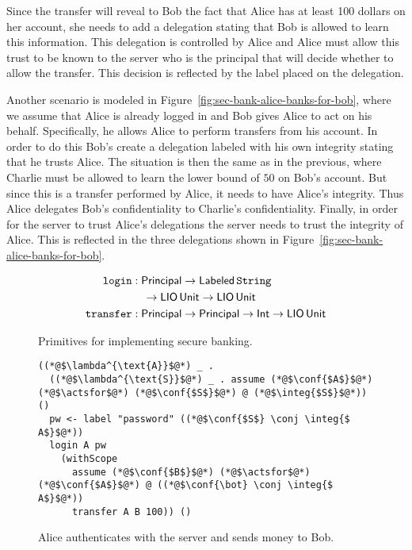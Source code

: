 Since the transfer will reveal to Bob the fact that Alice has at least 100 dollars on her account, she needs to add a delegation stating that Bob is allowed to learn this information. This delegation is controlled by Alice and Alice must allow this trust to be known to the server who is the principal that will decide whether to allow the transfer. This decision is reflected by the label placed on the delegation.

Another scenario is modeled in Figure~\ref{fig:sec-bank-alice-banks-for-bob}, where we assume that Alice is already logged in and Bob gives Alice to act on his behalf. Specifically, he allows Alice to perform transfers from his account. In order to do this Bob's create a delegation labeled with his own integrity stating that he trusts Alice. The situation is then the same as in the previous, where Charlie must be allowed to learn the lower bound of $50$ on Bob's account. But since this is a transfer performed by Alice, it needs to have Alice's integrity. Thus Alice delegates Bob's confidentiality to Charlie's confidentiality. Finally, in order for the server to trust Alice's delegations the server needs to trust the integrity of Alice. This is reflected in the three delegations shown in Figure~\ref{fig:sec-bank-alice-banks-for-bob}.

\begin{figure}
    \centering
    \begin{align*}
\mathtt{login}&: \mathsf{Principal} \to \mathsf{Labeled}\,\mathtt{String} \\ &\quad \to \mathsf{LIO}\,\mathsf{Unit} \to \mathsf{LIO}\,\mathsf{Unit}\\
\mathtt{transfer}&: \mathsf{Principal} \to \mathsf{Principal} \to \mathsf{Int} \to \mathsf{LIO}\,\mathsf{Unit}
\end{align*}
    \caption{Primitives for implementing secure banking.}
    \label{fig:sec-banking-sigs}
\end{figure}

\begin{figure}
\centering
\begin{lstlisting}
((*@$\lambda^{\text{A}}$@*) _ .
  ((*@$\lambda^{\text{S}}$@*) _ . assume (*@$\conf{$A$}$@*) (*@$\actsfor$@*) (*@$\conf{$S$}$@*) @ (*@$\integ{$S$}$@*)) ()
  pw <- label "password" ((*@$\conf{$S$} \conj \integ{$ A$}$@*))
  login A pw
    (withScope
      assume (*@$\conf{$B$}$@*) (*@$\actsfor$@*) (*@$\conf{$A$}$@*) @ ((*@$\conf{\bot} \conj \integ{$ A$}$@*))
      transfer A B 100)) ()
\end{lstlisting}
\caption{Alice authenticates with the server and sends money to Bob.}
\label{fig:sec-bank-alice-send-to-bob}
\end{figure}

